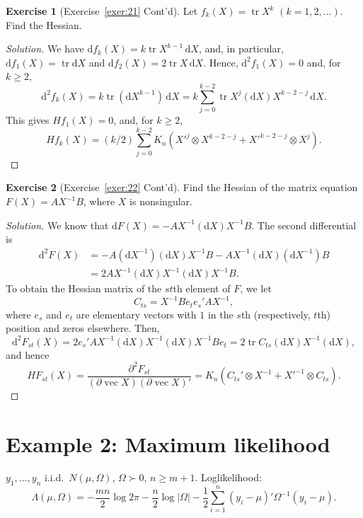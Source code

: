 \documentclass[14pt]{extarticle}
\theoremstyle{plain}
\theoremstyle{definition}
\newtheorem{exercise}{Exercise}
\theoremstyle{remark}
\newenvironment{solution}{%
  \begin{proof}[Solution]%
}{%
  \end{proof}%
}
\DeclareMathOperator{\tr}{tr}
\DeclareMathOperator{\avec}{vec}
\newcommand{\dd}{\mathrm{d}}
\begin{document}
\begin{exercise}[Exercise~\ref{exer:21} Cont'd]\label{exer:31}
Let $f_k(X) = \tr X^k$ $(k = 1, 2, \dots)$. Find the Hessian.
\end{exercise}

\begin{solution}
We have $\dd f_k(X) = k\tr X^{k-1}\, \dd X$, and, in particular, $\dd f_1(X) = \tr \dd X$ and $\dd f_2(X) = 2\tr X\, \dd X$. Hence, $\dd^2 f_1(X) = 0$ and, for $k \geqslant 2$,
\[
\dd^2 f_k(X) = k\tr(\dd X^{k-1})\, \dd X = k\sum_{j=0}^{k-2} \tr X^j(\dd X) X^{k-2-j}\, \dd X.
\]
This gives $Hf_1(X) = 0$, and, for $k \geqslant 2$,
\[
Hf_k(X) = (k/2) \sum_{j=0}^{k-2} K_n(X'^j \otimes X^{k-2-j} + X'^{k-2-j} \otimes X^j).
\]
\end{solution}

\begin{exercise}[Exercise~\ref{exer:22} Cont'd]\label{exer:32}
Find the Hessian of the matrix equation $F(X) = AX^{-1}B$, where $X$ is nonsingular.
\end{exercise}

\begin{solution}
We know that $\dd F(X) = -AX^{-1}(\dd X)X^{-1}B$. The second differential is
\begin{align*}
\dd^2 F(X) &= -A(\dd X^{-1})(\dd X)X^{-1}B - AX^{-1}(\dd X)(\dd X^{-1})B \\
&= 2AX^{-1}(\dd X)X^{-1}(\dd X)X^{-1}B.
\end{align*}
To obtain the Hessian matrix of the $st$th element of $F$, we let
\[
C_{ts} = X^{-1}B e_t e_s' A X^{-1},
\]
where $e_s$ and $e_t$ are elementary vectors with $1$ in the $s$th (respectively, $t$th) position and zeros elsewhere. Then,
\[
\dd^2 F_{st}(X) = 2e_s' A X^{-1}(\dd X) X^{-1}(\dd X) X^{-1} B e_t = 2\tr C_{ts}(\dd X) X^{-1}(\dd X),
\]
and hence
\[
HF_{st}(X) = \frac{\partial^2 F_{st}}{(\partial \avec X)(\partial \avec X)'} = K_n(C_{ts}' \otimes X^{-1} + X'^{-1} \otimes C_{ts}).
\]
\end{solution}

\section{Example 2: Maximum likelihood}\label{sec:13}

$y_1, \dots, y_n$ i.i.d.\ $N(\mu, \Omega)$, $\Omega \succ 0$, $n \geqslant m+1$. Loglikelihood:
\begin{equation}\label{eq:43}
\Lambda(\mu, \Omega) = -\frac{mn}{2}\log 2\pi - \frac{n}{2}\log|\Omega|
- \frac{1}{2}\sum_{i=1}^{n}(y_i - \mu)'\Omega^{-1}(y_i - \mu).
\end{equation}
\end{document}
